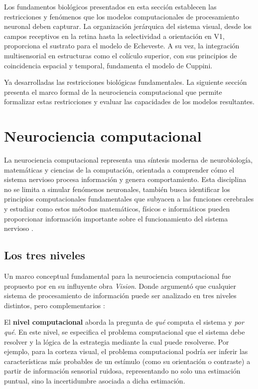 Los fundamentos biológicos presentados en esta sección establecen las restricciones y fenómenos que los modelos computacionales de procesamiento neuronal deben capturar. La organización jerárquica del sistema visual, desde los campos receptivos en la retina hasta la selectividad a orientación en V1, proporciona el sustrato para el modelo de Echeveste. A su vez, la integración multisensorial en estructuras como el colículo superior, con sus principios de coincidencia espacial y temporal, fundamenta el modelo de Cuppini.

Ya desarrolladas las restricciones biológicas fundamentales. La siguiente sección presenta el marco formal de la neurociencia computacional que permite formalizar estas restricciones y evaluar las capacidades de los modelos resultantes.


\section{Neurociencia computacional}
\label{sec:neuro_computacional}

La neurociencia computacional representa una síntesis moderna de neurobiología, matemáticas y ciencias de la computación, orientada a comprender cómo el sistema nervioso procesa información y genera comportamiento. Esta disciplina no se limita a simular fenómenos neuronales, también busca identificar los principios computacionales fundamentales que subyacen a las funciones cerebrales y estudiar como estos métodos matemáticos, físicos e informáticos pueden proporcionar información importante sobre el funcionamiento del sistema nervioso \citep{dayan2005theoretical}.

\subsection{Los tres niveles}
\label{subsec:marr_niveles}

Un marco conceptual fundamental para la neurociencia computacional fue propuesto por \citet{marr2010vision} en su influyente obra \textit{Vision}. Donde argumentó que cualquier sistema de procesamiento de información puede ser analizado en tres niveles distintos, pero complementarios \citep{marr2010vision}:

El \textbf{nivel computacional} aborda la pregunta de \textit{qué} computa el sistema y \textit{por qué}. En este nivel, se especifica el problema computacional que el sistema debe resolver y la lógica de la estrategia mediante la cual puede resolverse. Por ejemplo, para la corteza visual, el problema computacional podría ser inferir las características más probables de un estímulo (como su orientación o contraste) a partir de información sensorial ruidosa, representando no solo una estimación puntual, sino la incertidumbre asociada a dicha estimación.

